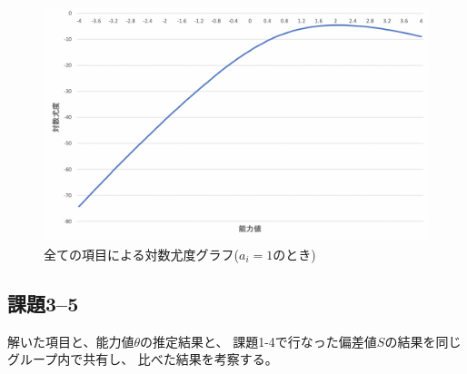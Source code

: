\documentclass[12pt]{jarticle}
\begin{document}
\begin{figure}[h]
    \begin{center}
        \includegraphics[scale=0.3]{kadai5_3_4.png}
    \end{center}
    \caption{全ての項目による対数尤度グラフ($a_i=1$のとき)}
\end{figure}

\clearpage

\subsection{課題3–5}
\begin{shadebox}
    解いた項目と、能力値$\theta$の推定結果と、
    課題1-4で行なった偏差値$S$の結果を同じグループ内で共有し、
    比べた結果を考察する。
\end{shadebox}
\end{document}
